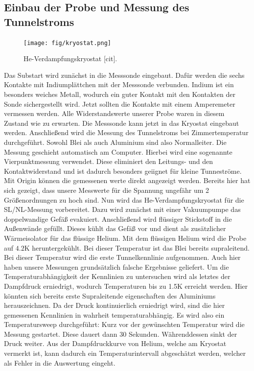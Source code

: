 \documentclass[twoside,        %
               BCOR12mm,       %
               english,ngerman, %
               fleqn,headsepline=false,footsepline=false
              ]{Vorlage/MFPREPORT}
\begin{document}
\subsection{Einbau der Probe und Messung des Tunnelstroms}
\begin{figure}[]
    \centering
    \texttt{[image: fig/kryostat.png]}
    \caption{He-Verdampfungskryostat [cit].}
    \label{fig:kryostat}
\end{figure}
Das Substart wird zunächst in die Messsonde eingebaut. Dafür werden die sechs
Kontakte mit Indiumplättchen mit der Messsonde verbunden. Indium ist ein
besonders weiches Metall, wodurch ein guter Kontakt mit den Kontakten der Sonde
sichergestellt wird. Jetzt sollten die Kontakte mit einem Amperemeter vermessen
werden. Alle Widerstandswerte unserer Probe waren in diesem Zustand wie zu
erwarten.
Die Messsonde kann jetzt in das Kryostat eingebaut werden. Anschließend wird
die Messung des Tunnelstroms bei Zimmertemperatur durchgeführt. Sowohl Blei als
auch Aluminium sind also Normalleiter. Die Messung geschieht automatisch am
Computer. Hierbei wird eine sogenannte Vierpunktmessung verwendet. Diese
eliminiert den Leitungs- und den Kontaktwiderstand und ist dadurch besonders
geiignet für kleine Tunneströme.
Mit Origin können die gemessenen werte direkt angezeigt werden.
Bereits hier hat sich gezeigt, dass unsere Messwerte für die Spannung
ungefähr um 2 Größenordnungen zu hoch sind.
Nun wird das He-Verdampfungskryostat für die SL/NL-Messung vorbereitet. Dazu wird zunächst mit einer Vakuumpumpe das doppelwandige Gefäß evakuiert. Anschließend wird flüssiger
Stickstoff in die Außenwände gefüllt. Dieses kühlt das Gefäß vor und dient als
zusätzlicher Wärmeisolator für das flüssige Helium. Mit dem flüssigen Helium
wird die Probe auf $4.2$\;K heruntergekühlt. Bei dieser Temperatur ist das Blei
bereits supraleitend. Bei dieser Temperatur wird die erste Tunnelkennlinie
aufgenommen. Auch hier haben unsere Messungen grundsätzlich falsche Ergebnisse
geliefert. Um die Temperaturabhängigkeit der Kennlinien zu untersuchen wird als
letztes der Dampfdruck erniedrigt, wodurch Temperaturen bis zu 1.5\;K erreicht
werden. Hier könnten sich bereits erste Supraleitende eigenschaften des
Aluminiums herauszeichnen. Da der Druck kontinuierlich erniedrigt wird, sind
die hier gemessenen Kennlinien in wahrheit temperaturabhängig. Es wird also ein
Temperatursweep durchgeführt: Kurz vor der gewünschten Temperatur wird die
Messung gestartet. Diese dauert dann 30 Sekunden. Währenddessen sinkt der Druck
weiter. Aus der Dampfdruckkurve von Helium, welche am Kryostat vermerkt ist,
kann dadurch ein Temperaturintervall abgeschätzt werden, welcher als Fehler in
die Auswertung eingeht.
\end{document}
